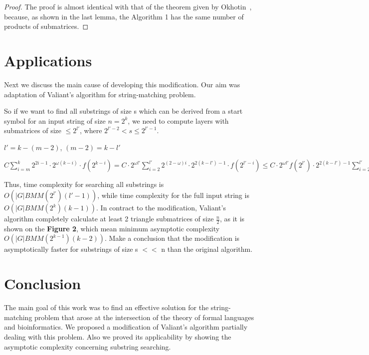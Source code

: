 \documentclass[runningheads]{llncs}
\begin{document}
\begin{proof}
The proof is almost identical with that of the theorem given by Okhotin~\cite{okhotin}, because, as shown in the last lemma, the Algorithm 1 has the same number of products of submatrices.
\end{proof}

\section{Applications}

Next we discuss the main cause of developing this modification. Our aim was adaptation of Valiant's algorithm for string-matching problem. 

So if we want to find all substrings of size s which can be derived from a start symbol for an input string of size $n = 2^k$, we need to compute layers with submatrices of size $\le 2^{l'}$, where $ 2^{l' - 2} < s \le 2^{l' - 1}$.

$l' = k - (m - 2)$, $(m - 2) = k - l'$

$ C \sum\limits_{i=m}^k 2^{2i - 1} \cdot 2^{\omega(k - i)} \cdot f(2^{k - i}) = C \cdot 2^{\omega l'}\sum\limits_{i=2}^{l'} 2^{(2 - \omega)i} \cdot 2^{2(k - l') - 1} \cdot f(2^{l' - i}) \le C \cdot 2^{\omega l'} f(2^{l'}) \cdot 2^{2(k - l') - 1} \sum\limits_{i=2}^{l'} 2^{(2 - \omega)i} = BMM(2^{l'}) \cdot 2^{2(k - l') - 1} \sum\limits_{i=2}^{l'} 2^{(2 - \omega)i}$ 

Thus, time complexity for searching all substrings is  $O(|G|BMM(2^{l'})(l' - 1))$, while time complexity for the full input string is $O(|G|BMM(2^k)(k - 1))$. In contract to the modification, Valiant's algorithm completely calculate at least 2 triangle submatrices of size $\frac{n}{2}$, as it is shown on the \textbf{Figure 2}, which mean minimum asymptotic complexity  $O(|G|BMM(2^{k - 1})(k - 2))$. Make a conclusion that the modification is asymptotically faster for substrings of size s $<<$ n  than the original algorithm. 

\section{Conclusion}

The main goal of this work was to find an effective solution for the string-matching problem that arose at the intersection of the theory of formal languages and bioinformatics. We proposed a modification of Valiant's algorithm partially dealing with this problem. Also we proved its applicability by showing the asymptotic complexity concerning substring searching. 
\end{document}

